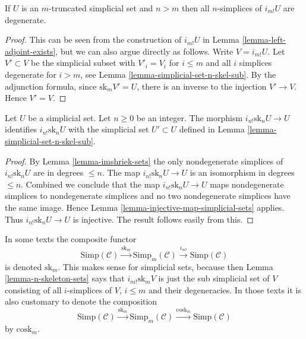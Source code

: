 \begin{lemma}
\label{lemma-imshriek-sets}
If $U$ is an $m$-truncated simplicial set and $n > m$
then all $n$-simplices of $i_{m!}U$ are degenerate.
\end{lemma}

\begin{proof}
This can be seen from the construction of
$i_{m!}U$ in Lemma \ref{lemma-left-adjoint-exists},
but we can also argue directly as follows.
Write $V = i_{m!}U$. Let $V' \subset V$ be the
simplicial subset with $V'_i = V_i$ for $i \leq m$
and all $i$ simplices degenerate for $i > m$,
see Lemma \ref{lemma-simplicial-set-n-skel-sub}.
By the adjunction formula,
since $\text{sk}_m V' = U$, there is an inverse to the
injection $V' \to V$. Hence $V' = V$.
\end{proof}

\begin{lemma}
\label{lemma-n-skeleton-sets}
Let $U$ be a simplicial set.
Let $n \geq 0$ be an integer.
The morphism $i_{n!} \text{sk}_n U \to U$ identifies
$i_{n!} \text{sk}_n U$ with the simplicial set
$U' \subset U$ defined in Lemma \ref{lemma-simplicial-set-n-skel-sub}.
\end{lemma}

\begin{proof}
By Lemma \ref{lemma-imshriek-sets} the only
nondegenerate simplices of $i_{n!} \text{sk}_n U$
are in degrees $\leq n$. The map
$i_{n!} \text{sk}_n U \to U$ is an isomorphism
in degrees $\leq n$. Combined we conclude
that the map $i_{n!} \text{sk}_n U \to U$ maps
nondegenerate simplices to nondegenerate simplices
and no two nondegenerate simplices have the same image.
Hence Lemma \ref{lemma-injective-map-simplicial-sets} applies.
Thus $i_{n!} \text{sk}_n U \to U$
is injective. The result follows easily from this.
\end{proof}

\begin{remark}
\label{remark-sk-literature}
In some texts the composite functor
$$
\text{Simp}(\mathcal{C})
\xrightarrow{\text{sk}_m}
\text{Simp}_m(\mathcal{C})
\xrightarrow{i_{m!}}
\text{Simp}(\mathcal{C})
$$
is denoted $\text{sk}_m$. This makes sense for simplicial sets,
because then Lemma \ref{lemma-n-skeleton-sets} says
that $i_{m!} \text{sk}_m V$ is just the sub simplicial set
of $V$ consisting of all $i$-simplices of $V$, $i \leq m$
and their degeneracies. In those texts it is also customary
to denote the composition
$$
\text{Simp}(\mathcal{C})
\xrightarrow{\text{sk}_m}
\text{Simp}_m(\mathcal{C})
\xrightarrow{\text{cosk}_m}
\text{Simp}(\mathcal{C})
$$
by $\text{cosk}_m$.
\end{remark}

